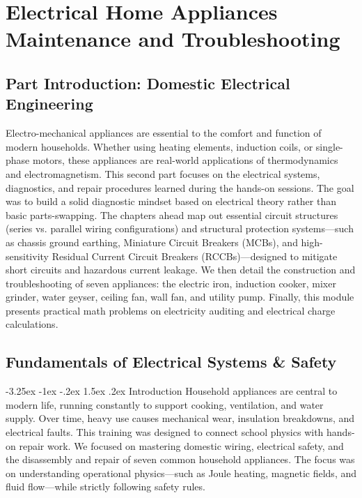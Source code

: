 \documentclass[11pt,a4paper]{report}
\makeatletter
\renewcommand{\section}{\@startsection{section}{1}{\z@}%
  {-3.25ex \@plus -1ex \@minus -.2ex}%
  {1.5ex \@plus.2ex}%
  {\normalfont\Large\bfseries\color{primaryColor}}}
\makeatother
\begin{document}
\part{Electrical Home Appliances Maintenance and Troubleshooting}
\chapter*{Part Introduction: Domestic Electrical Engineering}
Electro-mechanical appliances are essential to the comfort and function of modern households. Whether using heating elements, induction coils, or single-phase motors, these appliances are real-world applications of thermodynamics and electromagnetism. This second part focuses on the electrical systems, diagnostics, and repair procedures learned during the hands-on sessions. The goal was to build a solid diagnostic mindset based on electrical theory rather than basic parts-swapping. The chapters ahead map out essential circuit structures (series vs. parallel wiring configurations) and structural protection systems—such as chassis ground earthing, Miniature Circuit Breakers (MCBs), and high-sensitivity Residual Current Circuit Breakers (RCCBs)—designed to mitigate short circuits and hazardous current leakage. We then detail the construction and troubleshooting of seven appliances: the electric iron, induction cooker, mixer grinder, water geyser, ceiling fan, wall fan, and utility pump. Finally, this module presents practical math problems on electricity auditing and electrical charge calculations.
\chapter{Fundamentals of Electrical Systems \& Safety}
\section{Introduction}
Household appliances are central to modern life, running constantly to support cooking, ventilation, and water supply. Over time, heavy use causes mechanical wear, insulation breakdowns, and electrical faults. This training was designed to connect school physics with hands-on repair work. We focused on mastering domestic wiring, electrical safety, and the disassembly and repair of seven common household appliances. The focus was on understanding operational physics—such as Joule heating, magnetic fields, and fluid flow—while strictly following safety rules.
\end{document}
